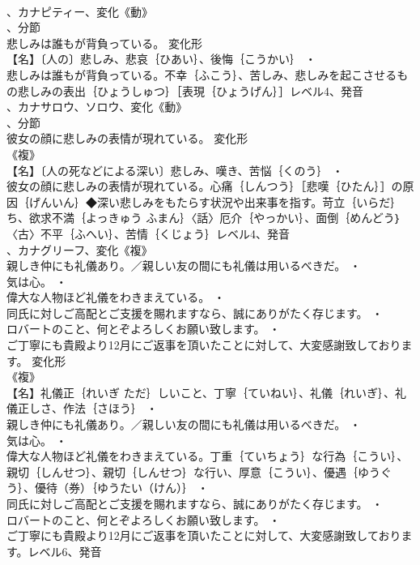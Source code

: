 \documentclass[8pt]{extreport}
\begin{document}
\begin{CJK}{UTF8}{min}
\\	、カナピティー、変化《動》
\\	、分節
\\	悲しみは誰もが背負っている。	変化形 
\\	【名】〔人の〕悲しみ、悲哀｛ひあい｝、後悔｛こうかい｝ ・
\\	悲しみは誰もが背負っている。不幸｛ふこう｝、苦しみ、悲しみを起こさせるもの悲しみの表出｛ひょうしゅつ｝［表現｛ひょうげん｝］レベル4、発音
\\	、カナサロウ、ソロウ、変化《動》
\\	、分節
\\	彼女の顔に悲しみの表情が現れている。	変化形 
\\	《複》
\\	【名】〔人の死などによる深い〕悲しみ、嘆き、苦悩｛くのう｝ ・
\\	彼女の顔に悲しみの表情が現れている。心痛｛しんつう｝［悲嘆｛ひたん｝］の原因｛げんいん｝◆深い悲しみをもたらす状況や出来事を指す。苛立｛いらだ｝ち、欲求不満｛よっきゅう ふまん｝〈話〉厄介｛やっかい｝、面倒｛めんどう｝〈古〉不平｛ふへい｝、苦情｛くじょう｝レベル4、発音
\\	、カナグリーフ、変化《複》
\\	親しき仲にも礼儀あり。／親しい友の間にも礼儀は用いるべきだ。 ・
\\	気は心。 ・
\\	偉大な人物ほど礼儀をわきまえている。 ・
\\	同氏に対しご高配とご支援を賜れますなら、誠にありがたく存じます。 ・
\\	ロバートのこと、何とぞよろしくお願い致します。 ・
\\	ご丁寧にも貴殿より12月にご返事を頂いたことに対して、大変感謝致しております。	変化形 
\\	《複》
\\	【名】礼儀正｛れいぎ ただ｝しいこと、丁寧｛ていねい｝、礼儀｛れいぎ｝、礼儀正しさ、作法｛さほう｝ ・
\\	親しき仲にも礼儀あり。／親しい友の間にも礼儀は用いるべきだ。 ・
\\	気は心。 ・
\\	偉大な人物ほど礼儀をわきまえている。丁重｛ていちょう｝な行為｛こうい｝、親切｛しんせつ｝、親切｛しんせつ｝な行い、厚意｛こうい｝、優遇｛ゆうぐう｝、優待（券）｛ゆうたい（けん）｝ ・
\\	同氏に対しご高配とご支援を賜れますなら、誠にありがたく存じます。 ・
\\	ロバートのこと、何とぞよろしくお願い致します。 ・
\\	ご丁寧にも貴殿より12月にご返事を頂いたことに対して、大変感謝致しております。レベル6、発音

\end{CJK}
\end{document}
